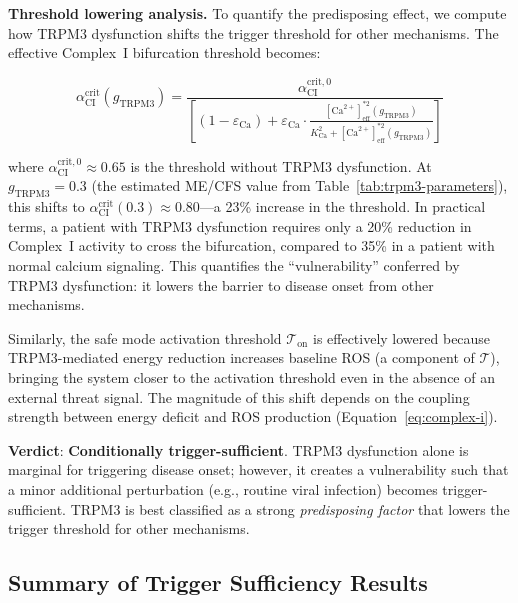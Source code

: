\textbf{Threshold lowering analysis.} To quantify the predisposing effect, we compute how TRPM3 dysfunction shifts the trigger threshold for other mechanisms. The effective Complex~I bifurcation threshold becomes:

\begin{equation}
\label{eq:trpm3-threshold-shift}
\alpha_{\text{CI}}^{\mathrm{crit}}(g_{\text{TRPM3}}) = \frac{\alpha_{\text{CI}}^{\mathrm{crit,0}}}{\left[(1 - \varepsilon_{\text{Ca}}) + \varepsilon_{\text{Ca}} \cdot \frac{[\text{Ca}^{2+}]_{\text{eff}}^{*2}(g_{\text{TRPM3}})}{K_{\text{Ca}}^2 + [\text{Ca}^{2+}]_{\text{eff}}^{*2}(g_{\text{TRPM3}})}\right]}
\end{equation}

where $\alpha_{\text{CI}}^{\mathrm{crit,0}} \approx 0.65$ is the threshold without TRPM3 dysfunction. At $g_{\text{TRPM3}} = 0.3$ (the estimated ME/CFS value from Table~\ref{tab:trpm3-parameters}), this shifts to $\alpha_{\text{CI}}^{\mathrm{crit}}(0.3) \approx 0.80$---a 23\% increase in the threshold. In practical terms, a patient with TRPM3 dysfunction requires only a 20\% reduction in Complex~I activity to cross the bifurcation, compared to 35\% in a patient with normal calcium signaling. This quantifies the ``vulnerability'' conferred by TRPM3 dysfunction: it lowers the barrier to disease onset from other mechanisms.

Similarly, the safe mode activation threshold $\mathcal{T}_{\text{on}}$ is effectively lowered because TRPM3-mediated energy reduction increases baseline ROS (a component of $\mathcal{T}$), bringing the system closer to the activation threshold even in the absence of an external threat signal. The magnitude of this shift depends on the coupling strength between energy deficit and ROS production (Equation~\ref{eq:complex-i}).

\textbf{Verdict}: \textbf{Conditionally trigger-sufficient}. TRPM3 dysfunction alone is marginal for triggering disease onset; however, it creates a vulnerability such that a minor additional perturbation (e.g., routine viral infection) becomes trigger-sufficient. TRPM3 is best classified as a strong \emph{predisposing factor} that lowers the trigger threshold for other mechanisms.

\subsection{Summary of Trigger Sufficiency Results}

